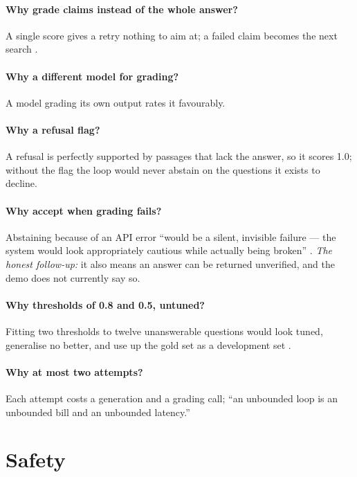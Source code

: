 \paragraph{Why grade claims instead of the whole answer?} A single score gives a retry nothing to aim at; a failed claim becomes the next search .

\paragraph{Why a different model for grading?} A model grading its own output rates it favourably.

\paragraph{Why a refusal flag?} A refusal is perfectly supported by passages that lack the answer, so it scores 1.0; without the flag the loop would never abstain on the questions it exists to decline.

\paragraph{Why accept when grading fails?} Abstaining because of an API error \enquote{would be a silent, invisible failure --- the system would look appropriately cautious while actually being broken} . \emph{The honest follow-up:} it also means an answer can be returned unverified, and the demo does not currently say so.

\paragraph{Why thresholds of 0.8 and 0.5, untuned?} Fitting two thresholds to twelve unanswerable questions would look tuned, generalise no better, and use up the gold set as a development set .

\paragraph{Why at most two attempts?} Each attempt costs a generation and a grading call; \enquote{an unbounded loop is an unbounded bill and an unbounded latency.}

\section{Safety}


